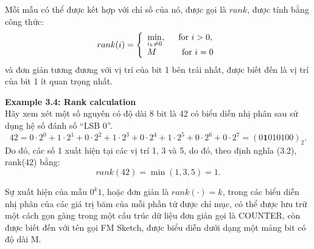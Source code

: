 \documentclass[a4paper,13pt]{article}
\theoremstyle{mytheor}
\begin{document}
Mỗi mẫu có thể được kết hợp với chỉ số của nó, được gọi là $rank$, được tính bằng công thức:
\[
    rank(i)=\left\{
                \begin{array}{ll}
                    \min\limits_{i_k\neq 0}, \indent\text{for } i > 0,\\
                    M\indent\indent\text{for } i = 0
                \end{array}
            \right.
\]
và đơn giản tương đương với vị trí của bit 1 bên trái nhất, được biết đến là vị trí của bit 1 ít quan trọng nhất.
\begin{mdframed}
    \textbf{Example 3.4: Rank calculation}\\
    Hãy xem xét một số nguyên có độ dài 8 bit là 42 có biểu diễn nhị phân sau sử dụng hệ số đánh số \textquotedblleft LSB 0\textquotedblright.
    \[
        42 = 0\cdot2^0+1\cdot2^1+0\cdot2^2+1\cdot2^3+0\cdot2^4+1\cdot2^5+0\cdot2^6+0\cdot2^7 = (0\textbf{1}010100)_2 .
    \]
    Do đó, các số 1 xuất hiện tại các vị trí 1, 3 và 5, do đó, theo định nghĩa (3.2), rank(42) bằng:
    \[rank(42) = \min(1,3,5) = 1.\]
\end{mdframed}
Sự xuất hiện của mẫu $0^k 1$, hoặc đơn giản là $rank(\cdot) = k$, trong các biểu diễn nhị phân của các giá trị băm của mỗi phần tử được chỉ mục, 
có thể được lưu trữ một cách gọn gàng trong một cấu trúc dữ liệu đơn giản gọi là COUNTER, còn được biết đến với tên gọi FM Sketch, 
được biểu diễn dưới dạng một mảng bit có độ dài M.
\end{document}
